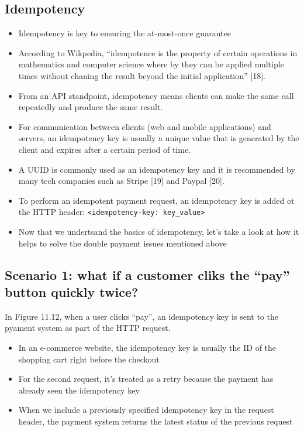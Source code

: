 \documentclass{report}
\theoremstyle{definition}
\let\oldsubsection\subsection
\renewcommand{\subsection}{\oldsubsection*}
\begin{document}
\subsection{Idempotency}

\begin{itemize}
\item
Idempotency is key to ensuring the at-most-once guarantee
\item
According to Wikpedia, ``idempotence is the property of certain operations in mathematics and computer science where by they can be applied multiple times without chaning the result beyond the initial application'' [18].
\item
From an API standpoint, idempotency means clients can make the same call repeatedly and produce the same result.
\item
For communication between clients (web and mobile applications) and servers, an idempotency key is usually a unique value that is generated by the client and expires after a certain period of time.
\item
A UUID is commonly used as an idempotency key and it is recommended by many tech companies such as Stripe [19] and Paypal [20].
\item
To perform an idempotent payment request, an idempotency key is added ot the HTTP header: \lstinline|<idempotency-key: key_value>|
\item
Now that we undertsand the basics of idempotency, let's take a look at how it helps to solve the double payment issues mentioned above
\end{itemize}

\subsection{Scenario 1: what if a customer cliks the ``pay'' button quickly twice?}

In Figure 11.12, when a user clicks ``pay'', an idempotency key is sent to the pyament system as part of the HTTP request.

\begin{itemize}
\item
In an e-commerce website, the idempotency key is usually the ID of the shopping cart right before the checkout
\item
For the second request, it's treated as a retry because the payment has already seen the idempotency key
\item
When we include a previously specified idempotency key in the request header, the payment system returns the latest status of the previous request
\end{itemize}
\end{document}
